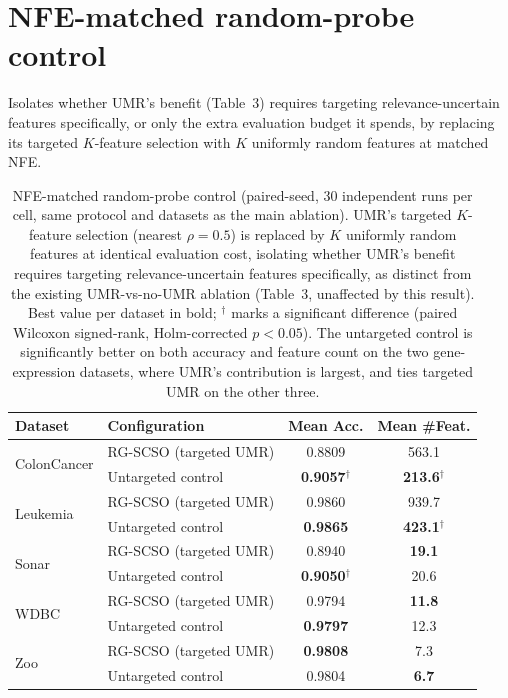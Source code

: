 \documentclass[9pt]{article}
\begin{document}
\FloatBarrier
\section{NFE-matched random-probe control}
Isolates whether UMR's benefit
(Table~3) requires targeting relevance-uncertain features specifically, or
only the extra evaluation budget it spends, by replacing its targeted
$K$-feature selection with $K$ uniformly random features at matched NFE.

\begin{table}[t]
\centering
\caption{NFE-matched random-probe control (paired-seed, 30 independent runs per cell, same protocol and datasets as the main ablation). UMR's targeted $K$-feature selection (nearest $\rho=0.5$) is replaced by $K$ uniformly random features at identical evaluation cost, isolating whether UMR's benefit requires targeting relevance-uncertain features specifically, as distinct from the existing UMR-vs-no-UMR ablation (Table~3, unaffected by this result). Best value per dataset in bold; $^\dagger$ marks a significant difference (paired Wilcoxon signed-rank, Holm-corrected $p<0.05$). The untargeted control is significantly better on both accuracy and feature count on the two gene-expression datasets, where UMR's contribution is largest, and ties targeted UMR on the other three.}
\label{tab:nfecontrol}
\footnotesize
\begin{tabular}{llcc}
\toprule
Dataset & Configuration & Mean Acc. & Mean \#Feat. \\
\midrule
\multirow{2}{*}{ColonCancer} & RG-SCSO (targeted UMR) & 0.8809 & 563.1 \\
 & Untargeted control & \textbf{0.9057}$^\dagger$ & \textbf{213.6}$^\dagger$ \\
\midrule
\multirow{2}{*}{Leukemia} & RG-SCSO (targeted UMR) & 0.9860 & 939.7 \\
 & Untargeted control & \textbf{0.9865} & \textbf{423.1}$^\dagger$ \\
\midrule
\multirow{2}{*}{Sonar} & RG-SCSO (targeted UMR) & 0.8940 & \textbf{19.1} \\
 & Untargeted control & \textbf{0.9050}$^\dagger$ & 20.6 \\
\midrule
\multirow{2}{*}{WDBC} & RG-SCSO (targeted UMR) & 0.9794 & \textbf{11.8} \\
 & Untargeted control & \textbf{0.9797} & 12.3 \\
\midrule
\multirow{2}{*}{Zoo} & RG-SCSO (targeted UMR) & \textbf{0.9808} & 7.3 \\
 & Untargeted control & 0.9804 & \textbf{6.7} \\
\bottomrule
\end{tabular}
\end{table}
\end{document}
